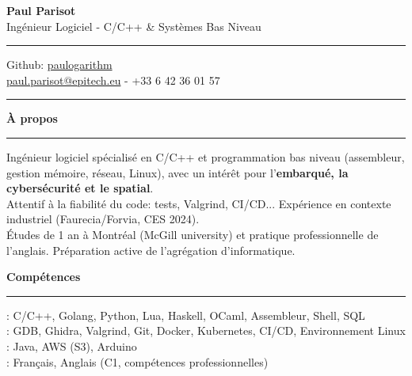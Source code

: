 \documentclass[9pt]{extarticle}
\begin{document}
\begin{center}
	{\huge\bfseries Paul Parisot}
	\\[4pt]
	{\Large Ingénieur Logiciel - C/C++ \& Systèmes Bas Niveau}
	\\
\end{center}

\par\vspace{-5pt}
\rule{\linewidth}{0.4pt}
\par\vspace{-5pt}

\begin{center}
	Github: \href{https://github.com/paulogarithm}{paulogarithm}
	\\
	\href{mailto:paul.parisot@epitech.eu}{paul.parisot@epitech.eu} - +33 6 42 36 01 57
	\\
\end{center}

\par\vspace{-10pt}
\rule{\linewidth}{0.4pt}
\par\vspace{7pt}

{\large\bfseries À propos}
\par\vspace{-8pt}
\rule{\linewidth}{0.4pt}
\par\vspace{5pt}

Ingénieur logiciel spécialisé en C/C++ et programmation bas niveau (assembleur, gestion mémoire, réseau, Linux), avec un intérêt pour l'{\bfseries embarqué, la cybersécurité et le spatial}.
\\
Attentif à la fiabilité du code: tests, Valgrind, CI/CD... Expérience en contexte industriel (Faurecia/Forvia, CES 2024).
\\
Études de 1 an à Montréal (McGill university) et pratique professionnelle de l'anglais. Préparation active de l'agrégation d'informatique.
\par\vspace{5pt}

{\large\bfseries Compétences}
\par\vspace{-8pt}
\rule{\linewidth}{0.4pt}
\par\vspace{5pt}

\hspace*{5pt}{\bfseries Maîtrise}: C/C++, Golang, Python, Lua, Haskell, OCaml, Assembleur, Shell, SQL
\\
\hspace*{5pt}{\bfseries Outils}: GDB, Ghidra, Valgrind, Git, Docker, Kubernetes, CI/CD, Environnement Linux
\\
\hspace*{5pt}{\bfseries Notions}: Java, AWS (S3), Arduino
\\
\hspace*{5pt}{\bfseries Langues}: Français, Anglais (C1, compétences professionnelles)
\end{document}
